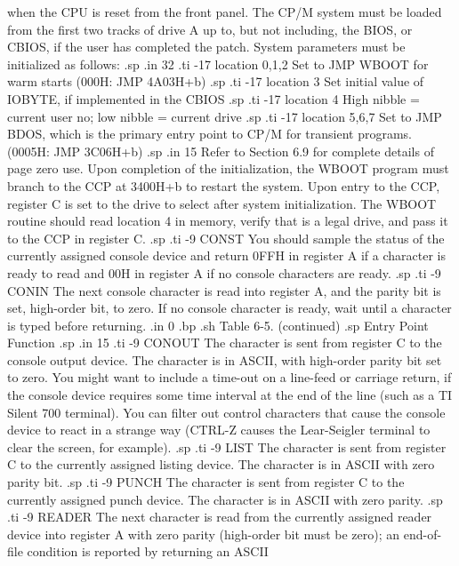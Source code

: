 when the CPU is reset from the front panel.  The CP/M system must be loaded 
from the first two tracks of drive A up to, but not including, the BIOS, or 
CBIOS, if the user has completed the patch.  System parameters must be 
initialized as follows:
.sp 
.in 32
.ti -17
location 0,1,2   Set to JMP WBOOT for warm starts (000H: JMP 4A03H+b)
.sp
.ti -17
location 3       Set initial value of IOBYTE, if implemented in the CBIOS
.sp
.ti -17
location 4       High nibble = current user no; low nibble = current drive
.sp
.ti -17
location 5,6,7   Set to JMP BDOS, which is the primary entry point to CP/M for 
transient programs.  (0005H: JMP 3C06H+b)
.sp
.in 15
Refer to Section 6.9 for complete details of page zero use.  
Upon completion of the initialization, the WBOOT program must branch to the 
CCP at 3400H+b to restart the system.  Upon entry to the CCP, register C is 
set to the drive to select after system initialization.  The WBOOT routine 
should read location 4 in memory, verify that is a legal drive, and pass it 
to the CCP in register C.
.sp
.ti -9
CONST    You should sample the status of the currently assigned console 
device and return 0FFH in register A if a character is ready to read and 00H 
in register A if no console characters are ready.
.sp
.ti -9
CONIN    The next console character is read into register A, and the parity 
bit is set, high-order bit, to zero.  If no console character is ready, 
wait until a character is typed before returning.
.in 0
.bp
.sh
                     Table 6-5.  (continued)
.sp
   Entry Point                    Function
.sp
.in 15
.ti -9
CONOUT   The character is sent from register C to the console 
output device.  The character is in ASCII, with high-order parity 
bit set to zero.  You might want to include a time-out on a 
line-feed or carriage return, if the console device requires some 
time interval at the end of the line (such as a TI Silent 700  
terminal).  You can filter out control characters that cause 
the console device to react in a strange way (CTRL-Z causes the 
Lear-Seigler terminal to clear the screen, for example).
.sp
.ti -9
LIST     The character is sent from register C to the currently 
assigned listing device.  The character is in ASCII with zero 
parity bit.
.sp
.ti -9
PUNCH    The character is sent from register C to the currently 
assigned punch device.  The character is in ASCII with zero 
parity. 
.sp
.ti -9
READER   The next character is read from the currently assigned reader 
device into register A with zero parity (high-order bit must be 
zero); an end-of-file condition is reported by returning an ASCII 
